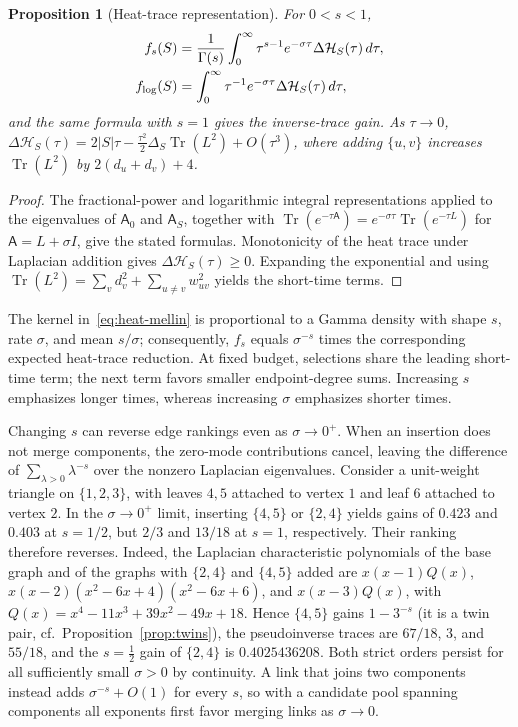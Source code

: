 \documentclass[conference]{IEEEtran}
\newtheorem{proposition}{Proposition}
\theoremstyle{definition}
\DeclareMathOperator{\Tr}{Tr}
\newcommand{\matA}{\mathsf A}
\begin{document}
\begin{proposition}[Heat-trace representation]
\label{prop:heat}
For $0<s<1$,
\begin{align}
f_s(S)&=\frac1{\Gamma(s)}\int_0^\infty \tau^{s-1}e^{-\sigma \tau}
\Delta\mathcal H_S(\tau)\,d\tau,\label{eq:heat-mellin}\\
f_{\log}(S)&=\int_0^\infty \tau^{-1}e^{-\sigma \tau}\Delta\mathcal H_S(\tau)\,d\tau,
\notag
\end{align}
and the same formula with $s=1$ gives the inverse-trace gain.
As $\tau\to0$,
$\Delta\mathcal H_S(\tau)=2|S|\tau-\frac{\tau^2}{2}\Delta_S\Tr(L^2)+O(\tau^3)$,
where adding $\{u,v\}$ increases $\Tr(L^2)$ by $2(d_u+d_v)+4$.
\end{proposition}
\begin{proof}
The fractional-power and logarithmic integral representations
applied to the eigenvalues of $\matA_0$ and $\matA_S$, together with
$\Tr(e^{-\tau \matA})=e^{-\sigma \tau}\Tr(e^{-\tau L})$ for
$\matA=L+\sigma I$, give the stated formulas.
Monotonicity of the heat trace under Laplacian addition gives
$\Delta\mathcal H_S(\tau)\ge0$. Expanding the exponential and using
$\Tr(L^2)=\sum_vd_v^2+\sum_{u\ne v}w_{uv}^2$ yields the short-time terms.
\end{proof}

The kernel in~\eqref{eq:heat-mellin} is proportional to a Gamma
density with shape $s$, rate $\sigma$, and mean $s/\sigma$;
consequently, $f_s$ equals $\sigma^{-s}$ times the corresponding
expected heat-trace reduction. At fixed budget, selections share the leading short-time term;
the next term favors smaller endpoint-degree sums. Increasing $s$
emphasizes longer times, whereas increasing $\sigma$ emphasizes
shorter times.

Changing $s$ can reverse edge rankings even as $\sigma\to0^+$.
When an insertion does not merge components, the zero-mode
contributions cancel, leaving the difference of
$\sum_{\lambda>0}\lambda^{-s}$ over the nonzero Laplacian
eigenvalues. Consider a unit-weight triangle on $\{1,2,3\}$,
with leaves $4,5$ attached to vertex $1$ and leaf $6$ attached
to vertex $2$. In the $\sigma\to0^+$ limit, inserting $\{4,5\}$
or $\{2,4\}$ yields gains of $0.423$ and $0.403$ at $s=1/2$,
but $2/3$ and $13/18$ at $s=1$, respectively. Their ranking
therefore reverses. Indeed, the Laplacian characteristic polynomials of the base graph
and of the graphs with $\{2,4\}$ and $\{4,5\}$ added are
$x(x-1)Q(x)$, $x(x-2)(x^2-6x+4)(x^2-6x+6)$, and $x(x-3)Q(x)$, with
$Q(x)=x^4-11x^3+39x^2-49x+18$. Hence $\{4,5\}$ gains $1-3^{-s}$
(it is a twin pair, cf.\ Proposition~\ref{prop:twins}), the
pseudoinverse traces are $67/18$, $3$, and $55/18$, and the $s=\frac12$
gain of $\{2,4\}$ is $0.4025436208$. Both strict orders persist for all
sufficiently small $\sigma>0$ by continuity. A link that joins two
components instead adds $\sigma^{-s}+O(1)$ for every $s$, so with a
candidate pool spanning components all exponents first favor merging
links as $\sigma\to0$.
\end{document}
